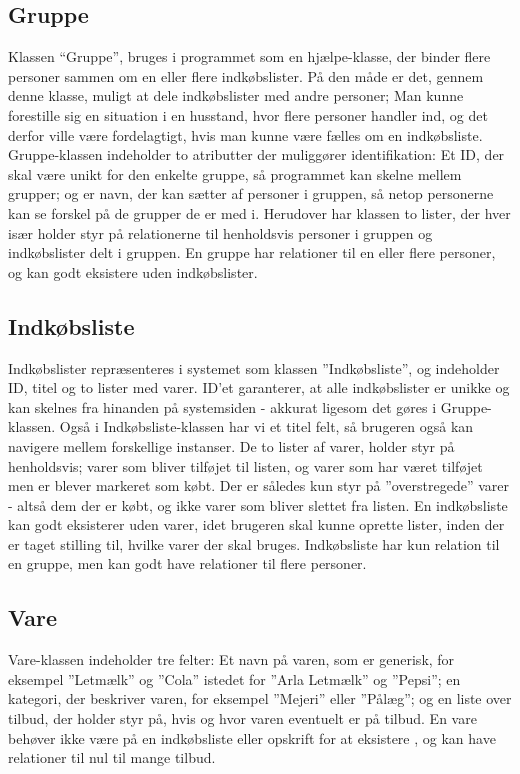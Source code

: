 \subsection{Gruppe}
Klassen ``Gruppe'', bruges i programmet som en hjælpe-klasse, der binder flere personer sammen om en eller flere indkøbslister. 
På den måde er det, gennem denne klasse, muligt at dele indkøbslister med andre personer; 
Man kunne forestille sig en situation i en husstand, hvor flere personer handler ind, og det derfor ville være fordelagtigt, hvis man kunne være fælles om en indkøbsliste.
Gruppe-klassen indeholder to atributter der muliggører identifikation: Et ID, der skal være unikt for den enkelte gruppe, så programmet kan skelne mellem grupper; og er navn, der kan sætter af personer i gruppen, så netop personerne kan se forskel på de grupper de er med i. 
Herudover har klassen to lister, der hver især holder styr på relationerne til henholdsvis personer i gruppen og indkøbslister delt i gruppen.
En gruppe har relationer til en eller flere personer, og kan godt eksistere uden indkøbslister.

\subsection{Indkøbsliste}
Indkøbslister repræsenteres i systemet som klassen ''Indkøbsliste'', og indeholder ID, titel og to lister med varer. 
ID'et garanterer, at alle indkøbslister er unikke og kan skelnes fra hinanden på systemsiden - akkurat ligesom det gøres i Gruppe-klassen. 
Også i Indkøbsliste-klassen har vi et titel felt, så brugeren også kan navigere mellem forskellige instanser.
De to lister af varer, holder styr på henholdsvis; varer som bliver tilføjet til listen, og varer som har været tilføjet men er blever markeret som købt. 
Der er således kun styr på ''overstregede'' varer - altså dem der er købt, og ikke varer som bliver slettet fra listen.
En indkøbsliste kan godt eksisterer uden varer, idet brugeren skal kunne oprette lister, inden der er taget stilling til, hvilke varer der skal bruges.
Indkøbsliste har kun relation til en gruppe, men kan godt have relationer til flere personer.

\subsection{Vare}
Vare-klassen indeholder tre felter: Et navn på varen, som er generisk, for eksempel ''Letmælk'' og ''Cola'' istedet for ''Arla Letmælk'' og ''Pepsi''; en kategori, der beskriver varen, for eksempel ''Mejeri'' eller ''Pålæg''; og en liste over tilbud, der holder styr på, hvis og hvor varen eventuelt er på tilbud.
En vare behøver ikke være på en indkøbsliste eller opskrift for at eksistere , og kan have relationer til nul til mange tilbud.

